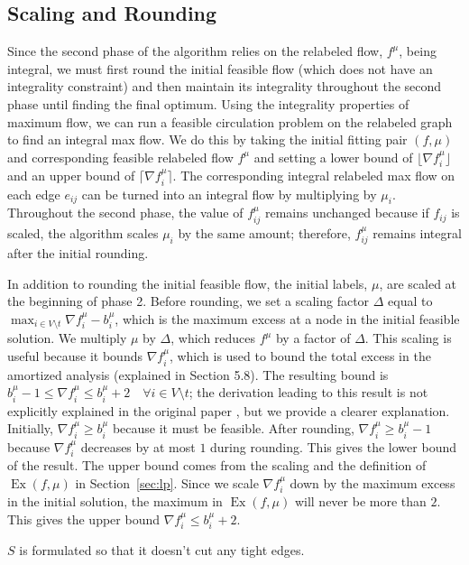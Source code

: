 \documentclass[11pt]{article}
\theoremstyle{definition}
\theoremstyle{definition}
\newcommand{\fu}{f^{\mu}}
\newcommand{\nfiu}{\nabla \fu_i}
\newcommand{\biu}{b_{i}^{\mu}}
\DeclareMathOperator{\Ex}{Ex}
\begin{document}
    \subsection{Scaling and Rounding} 
    Since the second phase of the algorithm relies on the relabeled flow, $f^\mu$, being integral, we must first round the initial feasible flow (which does not have an integrality constraint) and then maintain its integrality throughout the second phase until finding the final optimum. Using the integrality properties of maximum flow, we can run a feasible circulation problem on the relabeled graph to find an integral max flow. We do this by taking the initial fitting pair $(f, \mu)$ and corresponding feasible relabeled flow $f^\mu$ and setting a lower bound of $\lfloor \nabla f_i^\mu \rfloor$ and an upper bound of $\lceil \nabla f_i^\mu \rceil$. The corresponding integral relabeled max flow on each edge $e_{ij}$ can be turned into an integral flow by multiplying by $\mu_i$. Throughout the second phase, the value of $f_{ij}^\mu$ remains unchanged because if $f_{ij}$ is scaled, the algorithm scales $\mu_i$ by the same amount; therefore, $f_{ij}^\mu$ remains integral after the initial rounding.
    
    In addition to rounding the initial feasible flow, the initial labels, $\mu$, are scaled at the beginning of phase 2. Before rounding, we set a scaling factor $\Delta$ equal to $\max_{i \in V \setminus t} \nfiu - \biu$, which is the maximum excess at a node in the initial feasible solution. We multiply $\mu$ by $\Delta$, which reduces $f^\mu$ by a factor of $\Delta$. This scaling is useful because it bounds $\nfiu$, which is used to bound the total excess in the amortized analysis (explained in Section 5.8). The resulting bound is $\biu - 1 \leq \nfiu \leq \biu + 2 \quad \forall i \in V \setminus t $; the derivation leading to this result is not explicitly explained in the original paper \cite{Olver2017}, but we provide a clearer explanation. Initially, $\nfiu \geq \biu$ because it must be feasible. After rounding, $\nfiu \geq \biu - 1$ because $\nfiu$ decreases by at most $1$ during rounding. This gives the lower bound of the result. The upper bound comes from the scaling and the definition of $\Ex(f, \mu)$ in Section~\ref{sec:lp}. Since we scale $\nfiu$ down by the maximum excess in the initial solution, the maximum in $\Ex(f,\mu)$ will never be more than $2$. This gives the upper bound $\nfiu \leq \biu + 2$. 

	$S$ is formulated so that it doesn't cut any tight edges. 
\end{document}
